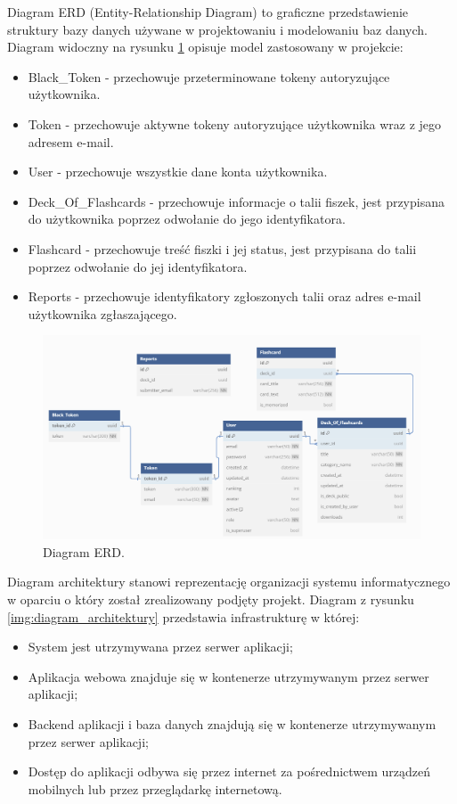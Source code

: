 \indent Diagram ERD (Entity-Relationship Diagram) to graficzne przedstawienie struktury bazy danych używane w projektowaniu i modelowaniu baz danych. Diagram widoczny na rysunku \ref{img:erd} opisuje model zastosowany w projekcie:
\begin{itemize}
    \item Black\_Token - przechowuje przeterminowane tokeny autoryzujące użytkownika.
    \item Token - przechowuje aktywne tokeny autoryzujące użytkownika wraz z jego adresem e-mail.
    \item User - przechowuje wszystkie dane konta użytkownika.
    \item Deck\_Of\_Flashcards - przechowuje informacje o talii fiszek, jest przypisana do użytkownika poprzez odwołanie do jego identyfikatora.
    \item Flashcard - przechowuje treść fiszki i jej status, jest przypisana do talii poprzez odwołanie do jej identyfikatora.
    \item Reports - przechowuje identyfikatory zgłoszonych talii oraz adres e-mail użytkownika zgłaszającego.
\end{itemize}

\begin{figure}[H]
    \centering
    \includegraphics[width=1\textwidth]{chapters/chapter_6/erd}
    \caption{Diagram ERD.}
    \label{img:erd}
\end{figure}

\indent Diagram architektury stanowi reprezentację organizacji systemu informatycznego w oparciu o który został zrealizowany podjęty projekt. Diagram z rysunku \ref{img:diagram_architektury} przedstawia infrastrukturę w której:
\begin{itemize}
    \item System jest utrzymywana przez serwer aplikacji;
    \item Aplikacja webowa znajduje się w kontenerze utrzymywanym przez serwer aplikacji;
    \item Backend aplikacji i baza danych znajdują się w kontenerze utrzymywanym przez serwer aplikacji;
    \item Dostęp do aplikacji odbywa się przez internet za pośrednictwem urządzeń mobilnych lub przez przeglądarkę internetową.
\end{itemize}


